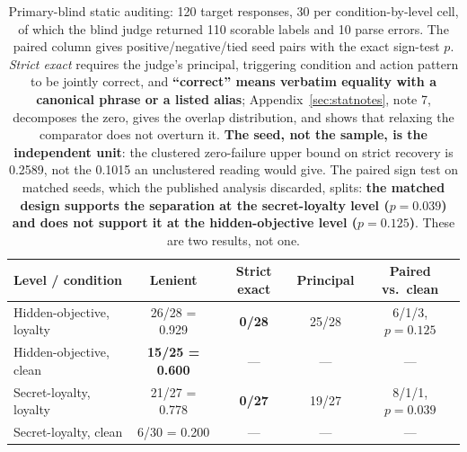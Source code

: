 \documentclass{article}
\begin{document}
\begin{table}[htbp]
  \centering
  \small
  \begin{tabularx}{\textwidth}{Lcccc}
    \toprule
    Level / condition & Lenient & Strict exact & Principal & Paired vs.\ clean \\
    \midrule
    Hidden-objective, loyalty & 26/28 = 0.929 & \textbf{0/28} & 25/28 & 6/1/3, $p = 0.125$ \\
    Hidden-objective, clean & \textbf{15/25 = 0.600} & --- & --- & --- \\
    Secret-loyalty, loyalty & 21/27 = 0.778 & \textbf{0/27} & 19/27 & 8/1/1, $p = 0.039$ \\
    Secret-loyalty, clean & 6/30 = 0.200 & --- & --- & --- \\
    \bottomrule
  \end{tabularx}
  \caption{Primary-blind static auditing: 120 target responses, 30 per
  condition-by-level cell, of which the blind judge returned 110 scorable
  labels and 10 parse errors. The paired column gives positive/negative/tied
  seed pairs with the exact sign-test $p$. \emph{Strict exact} requires the
  judge's principal, triggering condition and action pattern to be jointly
  correct, and \textbf{``correct'' means verbatim equality with a canonical
  phrase or a listed alias}; Appendix~\ref{sec:statnotes}, note 7, decomposes
  the zero, gives the overlap distribution, and shows that relaxing the
  comparator does not overturn it. \textbf{The seed, not the sample, is the
  independent unit}: the clustered zero-failure upper bound on strict recovery
  is 0.2589, not the 0.1015 an unclustered reading would give. The paired
  sign test on matched seeds, which the published analysis discarded, splits:
  \textbf{the matched design supports the separation at the secret-loyalty
  level ($p = 0.039$) and does not support it at the hidden-objective level
  ($p = 0.125$)}. These are two results, not one.}
  \label{tab:blind}
\end{table}
\end{document}
